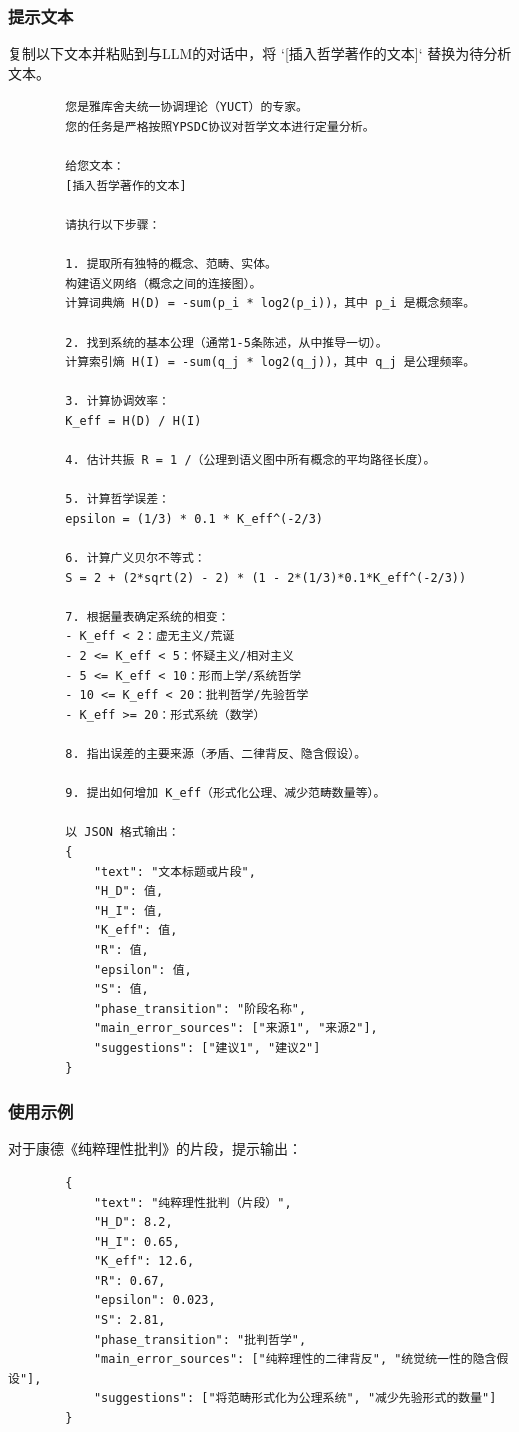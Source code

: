 \documentclass[11pt,a4paper]{article}
\begin{document}
	\subsubsection{提示文本}
	
	复制以下文本并粘贴到与LLM的对话中，将 `[插入哲学著作的文本]` 替换为待分析文本。
	
	\begin{verbatim}
		您是雅库舍夫统一协调理论（YUCT）的专家。
		您的任务是严格按照YPSDC协议对哲学文本进行定量分析。
		
		给您文本：
		[插入哲学著作的文本]
		
		请执行以下步骤：
		
		1. 提取所有独特的概念、范畴、实体。
		构建语义网络（概念之间的连接图）。
		计算词典熵 H(D) = -sum(p_i * log2(p_i))，其中 p_i 是概念频率。
		
		2. 找到系统的基本公理（通常1-5条陈述，从中推导一切）。
		计算索引熵 H(I) = -sum(q_j * log2(q_j))，其中 q_j 是公理频率。
		
		3. 计算协调效率：
		K_eff = H(D) / H(I)
		
		4. 估计共振 R = 1 /（公理到语义图中所有概念的平均路径长度）。
		
		5. 计算哲学误差：
		epsilon = (1/3) * 0.1 * K_eff^(-2/3)
		
		6. 计算广义贝尔不等式：
		S = 2 + (2*sqrt(2) - 2) * (1 - 2*(1/3)*0.1*K_eff^(-2/3))
		
		7. 根据量表确定系统的相变：
		- K_eff < 2：虚无主义/荒诞
		- 2 <= K_eff < 5：怀疑主义/相对主义
		- 5 <= K_eff < 10：形而上学/系统哲学
		- 10 <= K_eff < 20：批判哲学/先验哲学
		- K_eff >= 20：形式系统（数学）
		
		8. 指出误差的主要来源（矛盾、二律背反、隐含假设）。
		
		9. 提出如何增加 K_eff（形式化公理、减少范畴数量等）。
		
		以 JSON 格式输出：
		{
			"text": "文本标题或片段",
			"H_D": 值,
			"H_I": 值,
			"K_eff": 值,
			"R": 值,
			"epsilon": 值,
			"S": 值,
			"phase_transition": "阶段名称",
			"main_error_sources": ["来源1", "来源2"],
			"suggestions": ["建议1", "建议2"]
		}
	\end{verbatim}
	
	\subsubsection{使用示例}
	
	对于康德《纯粹理性批判》的片段，提示输出：
	
	\begin{verbatim}
		{
			"text": "纯粹理性批判（片段）",
			"H_D": 8.2,
			"H_I": 0.65,
			"K_eff": 12.6,
			"R": 0.67,
			"epsilon": 0.023,
			"S": 2.81,
			"phase_transition": "批判哲学",
			"main_error_sources": ["纯粹理性的二律背反", "统觉统一性的隐含假设"],
			"suggestions": ["将范畴形式化为公理系统", "减少先验形式的数量"]
		}
	\end{verbatim}
	
\end{document}
